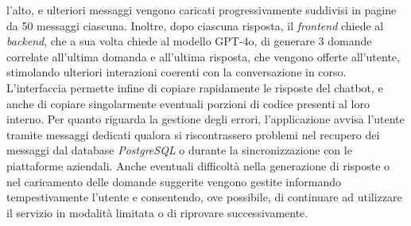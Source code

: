 l'alto, e ulteriori messaggi vengono caricati progressivamente suddivisi in pagine da 50 messaggi ciascuna. Inoltre, dopo ciascuna risposta, il 
\emph{frontend} chiede al \emph{backend}, che a sua volta chiede al modello GPT-4o, di generare 3 domande correlate all'ultima domanda e all'ultima risposta, che vengono offerte all'utente, stimolando ulteriori interazioni coerenti con la conversazione in corso. L'interfaccia permette infine di copiare rapidamente le 
risposte del chatbot, e anche di copiare singolarmente eventuali porzioni di codice presenti al loro interno.
Per quanto riguarda la gestione degli errori, l’applicazione avvisa l’utente tramite messaggi dedicati qualora si riscontrassero problemi nel recupero dei messaggi dal database
\emph{PostgreSQL} o durante la sincronizzazione con le piattaforme aziendali. Anche eventuali difficoltà nella generazione di 
risposte o nel caricamento delle domande suggerite vengono gestite informando tempestivamente l’utente e consentendo, ove possibile, di continuare ad utilizzare il servizio 
in modalità limitata o di riprovare successivamente.




